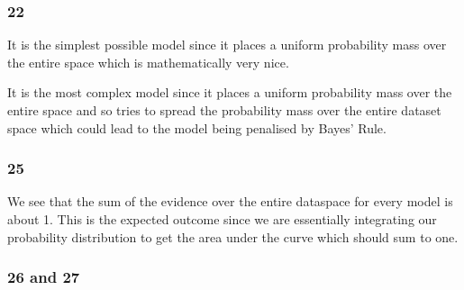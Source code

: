 \documentclass[11pt]{article}
\begin{document}
    \subsubsection*{22}\label{section}

It is the simplest possible model since it places a uniform probability
mass over the entire space which is mathematically very nice.

It is the most complex model since it places a uniform probability mass
over the entire space and so tries to spread the probability mass over
the entire dataset space which could lead to the model being penalised
by Bayes' Rule.

    \subsubsection*{25}\label{section}

We see that the sum of the evidence over the entire dataspace for every
model is about 1. This is the expected outcome since we are essentially
integrating our probability distribution to get the area under the curve
which should sum to one.
    \subsubsection*{26 and 27}\label{and-27}
    \begin{center}
    \end{center}
    { \hspace*{\fill} \\}

    \begin{center}
    \end{center}
    { \hspace*{\fill} \\}

    \begin{center}
    \end{center}
    { \hspace*{\fill} \\}

    \begin{center}
    \end{center}
    { \hspace*{\fill} \\}
\end{document}

